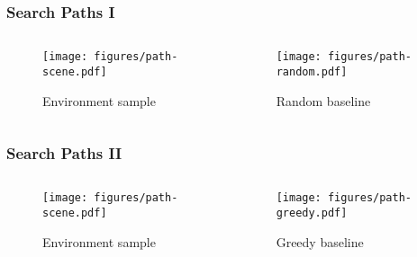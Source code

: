 \begin{frame}
    \frametitle{Search Paths I}

    \begin{columns}
        \begin{column}{0.5\textwidth}
            \begin{figure}
                \centering
                \texttt{[image: figures/path-scene.pdf]}
                \par Environment sample
            \end{figure}
        \end{column}
        \begin{column}{0.5\textwidth}
            \begin{figure}
                \centering
                \texttt{[image: figures/path-random.pdf]}
                \par Random baseline
            \end{figure}
        \end{column}
    \end{columns}
\end{frame}

\begin{frame}
    \frametitle{Search Paths II}

    \begin{columns}
        \begin{column}{0.5\textwidth}
            \begin{figure}
                \centering
                \texttt{[image: figures/path-scene.pdf]}
                \par Environment sample
            \end{figure}
        \end{column}
        \begin{column}{0.5\textwidth}
            \begin{figure}
                \centering
                \texttt{[image: figures/path-greedy.pdf]}
                \par Greedy baseline
            \end{figure}
        \end{column}
    \end{columns}
\end{frame}

